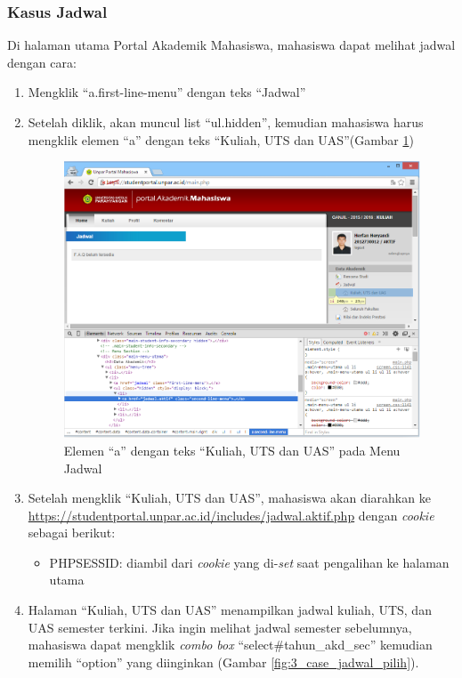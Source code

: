 \subsubsection{Kasus Jadwal}
Di halaman utama Portal Akademik Mahasiswa, mahasiswa dapat melihat jadwal dengan cara:
\begin{enumerate}
	\item Mengklik ``a.first-line-menu'' dengan teks ``Jadwal'' 
	\item Setelah diklik, akan muncul list ``ul.hidden'', kemudian mahasiswa harus mengklik elemen ``a'' dengan teks ``Kuliah, UTS dan UAS''(Gambar \ref{fig:3_case_jadwal_menu})
	\begin{figure}[H]
			\centering
			\includegraphics[scale=0.4]{Gambar/case-jadwal-menu}
			\caption{Elemen ``a'' dengan teks ``Kuliah, UTS dan UAS'' pada Menu Jadwal} 
			\label{fig:3_case_jadwal_menu}
		\end{figure}
		\item Setelah mengklik ``Kuliah, UTS dan UAS'', mahasiswa akan diarahkan ke \url{https://studentportal.unpar.ac.id/includes/jadwal.aktif.php} dengan \textit{cookie} sebagai berikut:
\begin{itemize}
	\item PHPSESSID: diambil dari \textit{cookie} yang di-\textit{set} saat pengalihan ke halaman utama
\end{itemize}
\item Halaman ``Kuliah, UTS dan UAS'' menampilkan jadwal kuliah, UTS, dan UAS semester terkini. Jika ingin melihat jadwal semester sebelumnya, mahasiswa dapat mengklik \textit{combo box} ``select\#tahun\_akd\_sec'' kemudian memilih ``option'' yang diinginkan (Gambar \ref{fig:3_case_jadwal_pilih}).
		

\end{enumerate}
